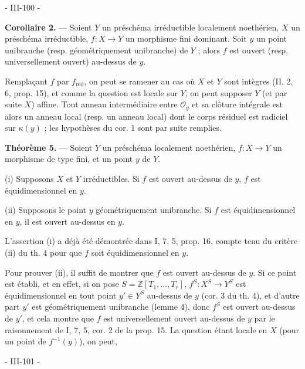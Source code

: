 
- III-100 -

\noindent
\textbf{Corollaire 2.} --- Soient $Y$ un préschéma irréductible localement noethérien, $X$ un préschéma irréductible, $f : X \to Y$ un morphisme fini dominant. Soit $y$ un point unibranche (resp. géométriquement unibranche) de $Y$ ; alors $f$ est ouvert (resp. universellement ouvert) au-dessus de $y$.

Remplaçant $f$ par $f_{\text{red}}$, on peut se ramener au cas où $X$ et $Y$ sont intègres (II, 2, 6, prop. 15), et comme la question est locale sur $Y$, on peut supposer $Y$ (et par suite $X$) affine. Tout anneau intermédiaire entre $\mathcal{O}_y$ et sa clôture intégrale est alors un anneau local (resp. un anneau local) dont le corps résiduel est radiciel sur $\kappa(y)$ ; les hypothèses du cor. 1 sont par suite remplies.

\textbf{Théorème 5.} --- Soient $Y$ un préschéma localement noethérien, $f : X \to Y$ un morphisme de type fini, et un point $y$ de $Y$.

(i) Supposons $X$ et $Y$ irréductibles. Si $f$ est ouvert au-dessus de $y$, $f$ est équidimensionnel en $y$.

(ii) Supposons le point $y$ géométriquement unibranche. Si $f$ est équidimensionnel en $y$, il est ouvert au-dessus en $y$.

L'assertion (i) a déjà été démontrée dans I, 7, 5, prop. 16, compte tenu du critère (ii) du th. 4 pour que $f$ soit équidimensionnel en $y$.

Pour prouver (ii), il suffit de montrer que $f$ est ouvert au-dessus de $y$. Si ce point est établi, et en effet, si on pose $S = \mathbb{Z}[T_1, \dots, T_r]$, $f^S : X^S \to Y^S$ est équidimensionnel en tout point $y' \in Y^S$ au-dessus de $y$ (cor. 3 du th. 4), et d'autre part $y'$ est géométriquement unibranche (lemme 4), donc $f^S$ est ouvert au-dessus de $y'$, et cela montre que $f$ est universellement ouvert au-dessus de $y$ par le raisonnement de I, 7, 5, cor. 2 de la prop. 15. La question étant locale en $X$ (pour un point de $f^{-1}(y)$), on peut,

\newpage


- III-101 -


